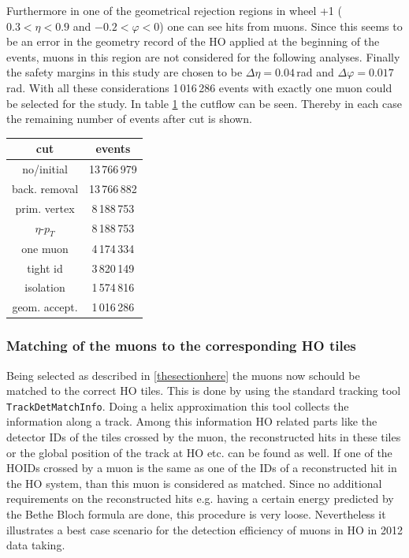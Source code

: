 			Furthermore in one of the geometrical rejection regions in wheel +1 ($0.3<\eta<0.9$ and $-0.2<\varphi<0$) one can see hits from muons.
			Since this seems to be an error in the geometry record of the HO applied at the beginning of the events, muons in this region are not considered for the following analyses.
			Finally the safety margins in this study are chosen to be $\Delta\eta = 0.04$\,rad and $\Delta\varphi = 0.017$\,rad.
			With all these considerations 1\,016\,286 events with exactly one muon could be selected for the study.
			In table \ref{CutFlow} the cutflow can be seen.
			Thereby in each case the remaining number of events after cut is shown.
			\begin{table}[htbH]
				\begin{center}
				\label{CutFlow}
					\begin{tabular}{|c|c|}
						\hline
						\textbf{cut}  & \textbf{events} \\ \hline \hline
			 			no/initial    & 13\,766\,979 		\\ \hline
			 			back. removal & 13\,766\,882 		\\ \hline
			 			prim. vertex  &  8\,188\,753 		\\ \hline
			 			$\eta$-$p_T$  &  8\,188\,753 		\\ \hline
			 			one muon      &  4\,174\,334 		\\ \hline
			 			tight id      &  3\,820\,149 		\\ \hline
			 			isolation     &  1\,574\,816 		\\ \hline
			 			geom. accept. &  1\,016\,286 		\\ \hline
					\end{tabular}
				\end{center}
			\end{table}
		\subsubsection{Matching of the muons to the corresponding HO tiles}
			Being selected as described in \ref{thesectionhere} the muons now schould be matched to the correct HO tiles.
			This is done by using the standard tracking tool \verb+TrackDetMatchInfo+.
			Doing a helix approximation this tool collects the information along a track.
			Among this information HO related parts like the detector IDs of the tiles crossed by the muon, the reconstructed hits in these tiles or the global position of the track at HO etc. can be
			found as well.
			If one of the HOIDs crossed by a muon is the same as one of the IDs of a reconstructed hit in the HO system, than this muon is considered as matched.
			Since no additional requirements on the reconstructed hits e.g. having a certain energy predicted by the Bethe Bloch formula are done, this procedure is very loose.
			Nevertheless it illustrates a best case scenario for the detection efficiency of muons in HO in 2012 data taking.
